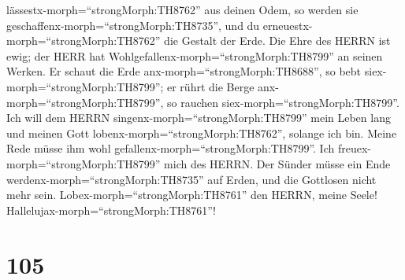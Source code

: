 lässestx-morph=``strongMorph:TH8762'' aus deinen Odem, so werden sie
geschaffenx-morph=``strongMorph:TH8735'', und du
erneuestx-morph=``strongMorph:TH8762'' die Gestalt der Erde.
 Die Ehre des HERRN ist ewig; der HERR hat
Wohlgefallenx-morph=``strongMorph:TH8799'' an seinen Werken.
 Er schaut die Erde anx-morph=``strongMorph:TH8688'', so
bebt siex-morph=``strongMorph:TH8799''; er rührt die Berge
anx-morph=``strongMorph:TH8799'', so rauchen
siex-morph=``strongMorph:TH8799''.  Ich will dem HERRN
singenx-morph=``strongMorph:TH8799'' mein Leben lang und meinen Gott
lobenx-morph=``strongMorph:TH8762'', solange ich bin. 
Meine Rede müsse ihm wohl gefallenx-morph=``strongMorph:TH8799''. Ich
freuex-morph=``strongMorph:TH8799'' mich des HERRN.  Der
Sünder müsse ein Ende werdenx-morph=``strongMorph:TH8735'' auf Erden,
und die Gottlosen nicht mehr sein. Lobex-morph=``strongMorph:TH8761''
den HERRN, meine Seele! Hallelujax-morph=``strongMorph:TH8761''!

\hypertarget{section-104}{%
\section{105}\label{section-104}}

